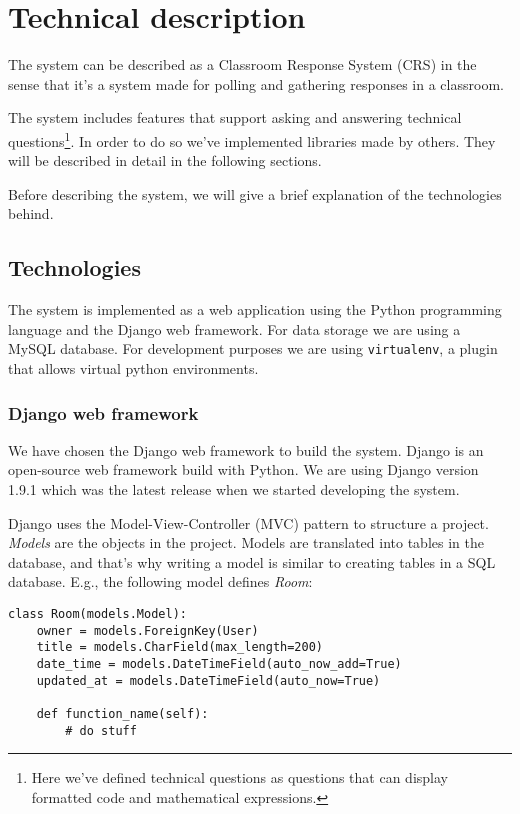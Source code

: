 \section{Technical description}
The system can be described as a Classroom Response System (CRS) in the sense that it's a system made for polling and gathering responses in a classroom.

The system includes features that support asking and answering technical questions\footnote{Here we've defined technical questions as questions that can display formatted code and mathematical expressions.}. In order to do so we've implemented libraries made by others. They will be described in detail in the following sections.

Before describing the system, we will give a brief explanation of the technologies behind.

\subsection{Technologies}

The system is implemented as a web application using the Python programming language and the Django web framework. For data storage we are using a MySQL database.
For development purposes we are using \texttt{virtualenv}, a plugin that allows virtual python environments.

\subsubsection{Django web framework}
We have chosen the Django web framework to build the system. Django is an open-source web framework build with Python. We are using Django version 1.9.1 which was the latest release when we started developing the system.

Django uses the Model-View-Controller (MVC) pattern to structure a project. \emph{Models} are the objects in the project. Models are translated into tables in the database, and that's why writing a model is similar to creating tables in a SQL database. E.g., the following model defines \emph{Room}: 

\begin{lstlisting}[caption=The Room Class, label=lst:room-class]
class Room(models.Model):
    owner = models.ForeignKey(User)
    title = models.CharField(max_length=200)
    date_time = models.DateTimeField(auto_now_add=True)
    updated_at = models.DateTimeField(auto_now=True)
    
    def function_name(self):
        # do stuff
\end{lstlisting}

